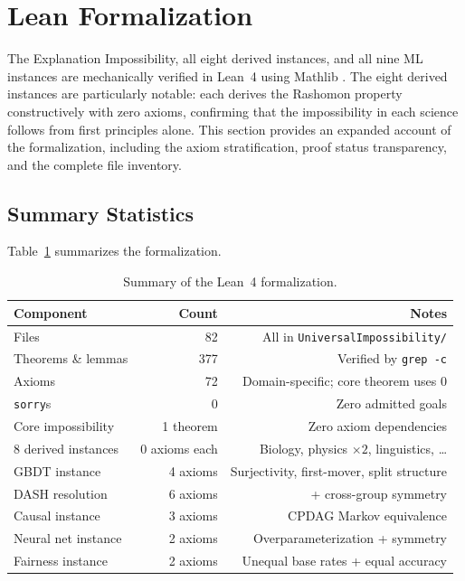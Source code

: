 \documentclass[11pt,a4paper]{article}
\begin{document}
\section{Lean Formalization}
\label{sec:lean}

The Explanation Impossibility, all eight derived instances, and all nine ML
instances are mechanically verified in Lean~4 \citep{demoura2021lean4} using
Mathlib \citep{mathlib2020}.  The eight derived instances are particularly
notable: each derives the Rashomon property constructively with zero axioms,
confirming that the impossibility in each science follows from first
principles alone.  This section provides an expanded account of the
formalization, including the axiom stratification, proof status transparency,
and the complete file inventory.

\subsection{Summary Statistics}

Table~\ref{tab:lean-summary} summarizes the formalization.

\begin{table}[ht]
\centering
\caption{Summary of the Lean~4 formalization.}
\label{tab:lean-summary}
\begin{tabular}{lrr}
\toprule
Component & Count & Notes \\
\midrule
Files & 82 & All in \texttt{UniversalImpossibility/} \\
Theorems \& lemmas & 377 & Verified by \texttt{grep -c} \\
Axioms & 72 & Domain-specific; core theorem uses 0 \\
\texttt{sorry}s & 0 & Zero admitted goals \\
\midrule
Core impossibility & 1 theorem & Zero axiom dependencies \\
8 derived instances & 0 axioms each & Biology, physics $\times 2$, linguistics, \ldots \\
GBDT instance & 4 axioms & Surjectivity, first-mover, split structure \\
DASH resolution & 6 axioms & + cross-group symmetry \\
Causal instance & 3 axioms & CPDAG Markov equivalence \\
Neural net instance & 2 axioms & Overparameterization + symmetry \\
Fairness instance & 2 axioms & Unequal base rates + equal accuracy \\
\bottomrule
\end{tabular}
\end{table}
\end{document}
